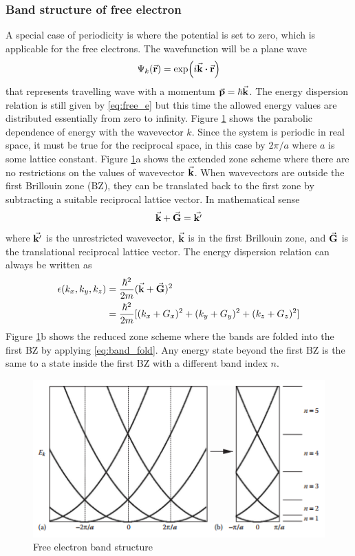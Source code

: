         \subsubsection{Band structure of free electron}
            A special case of periodicity is where the potential is set to zero, which is applicable for the free electrons. The wavefunction will be a plane wave 
            \begin{equation}
                \Psi_k(\va{r})  = \exp(i \va{k} \vdot \va{r})
            \end{equation} 
        that represents travelling wave with a momentum $\va{p} = \hbar \va{k}$. The energy dispersion relation is still given by \eqref{eq:free_e} but this time the allowed energy values are distributed essentially from zero to infinity. Figure \ref{fig:free-electron} shows the parabolic dependence of energy with the wavevector $k$. Since the system is periodic in real space, it must be true for the reciprocal space, in this case by $2\pi/a$ where $a$ is some lattice constant. Figure \ref{fig:free-electron}a shows the extended zone scheme where there are no restrictions on the values of wavevector $\va{k}$. When wavevectors are outside the first Brillouin zone (BZ), they can be translated back to the first zone by subtracting a suitable reciprocal lattice vector. In mathematical sense
        \begin{equation} \label{eq:band_fold}
            \va{k} + \va{G} = \va{k'}
        \end{equation}
        where $\va{k'}$ is the unrestricted wavevector, $\va{k}$ is in the first Brillouin zone, and $\va{G}$ is the translational reciprocal lattice vector. The energy dispersion relation can always be written as 
        \begin{align}
            \epsilon(k_x,k_y,k_z) &= \frac{\hbar^2}{2m} (\va{k}+\va{G})^2 \notag \\
                                &= \frac{\hbar^2}{2m}[(k_x + G_x)^2 + (k_y + G_y)^2 + (k_z + G_z)^2]
        \end{align}
        Figure \ref{fig:free-electron}b shows the reduced zone scheme where the  bands are folded into the first BZ by applying \eqref{eq:band_fold}. Any energy state beyond the first BZ is the same to a state inside the first BZ with a different band index $n$.

 \begin{figure}[tbh!]
	\centering
	\includegraphics[width=0.7\linewidth]{"images/free electron"}
	\caption[Free electron band structure]{Free electron band structure}
	\label{fig:free-electron}
\end{figure}

